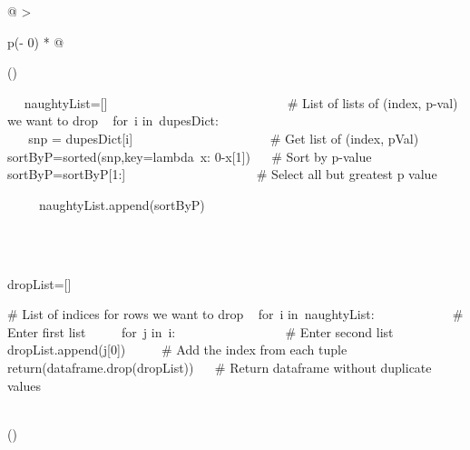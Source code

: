 \documentclass[12pt,a4paper]{article}
\begin{document}
\begin{longtable}[]{@{}
  >{\raggedright\arraybackslash}p{(\columnwidth - 0\tabcolsep) * }@{}}
\toprule()
\endhead
\begin{minipage}[t]{\linewidth}\raggedright
{~ ~naughtyList={[}{]} ~ ~ ~ ~ ~ ~ ~ ~ ~ ~ ~ ~ ~ ~ ~ ~ ~}{\# List of
lists of (index, p-val) we want to drop}{\hfill\break
~ }{for}{~i }{in}{~dupesDict:\\
\hspace*{0.333em} ~ ~ snp = dupesDict{[}i{]} ~ ~ ~ ~ ~ ~ ~ ~ ~ ~ ~ ~
~}{\# Get list of (index, pVal)}{\hfill\break
~ ~ ~ sortByP=sorted(snp,key=}{lambda}{~x: }{0}{-x{[}}{1}{{]}) ~ ~}{\#
Sort by p-value}{\hfill\break
~ ~ ~ sortByP=sortByP{[}}{1}{:{]} ~ ~ ~ ~ ~ ~ ~ ~ ~ ~ ~ ~ }{\# Select
all but greatest p value}{\hfill\break
~ ~ ~ naughtyList.append(sortByP)\\
\strut \\
\strut \\
\hspace*{0.333em} dropList={[}{]} ~ ~ ~ ~ ~ ~ ~ ~ ~ ~ ~ ~ }{\# List of
indices for rows we want to drop}{\hfill\break
~ }{for}{~i }{in}{~naughtyList: ~ ~ ~ ~ ~ ~ ~ }{\# Enter first
list}{\hfill\break
~ ~ ~ }{for}{~j }{in}{~i: ~ ~ ~ ~ ~ ~ ~ ~ ~ ~ }{\# Enter second
list}{\hfill\break
~ ~ ~ ~ ~ dropList.append(j{[}}{0}{{]}) ~ ~ ~ }{\# Add the index from
each tuple}{\hfill\break
\hfill\break
\hfill\break
~ }{return}{(dataframe.drop(dropList)) ~ ~}{\# Return dataframe without
duplicate values}\strut
\end{minipage} \\
\bottomrule()
\end{longtable}

{\hfill\break
\hfill\break
\hfill\break
}

\protect\hypertarget{t.59b2d73cce28e0f846926b398a5396f1238f472c}{}{}\protect\hypertarget{t.2}{}{}
\end{document}
